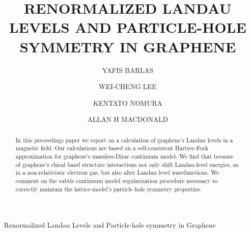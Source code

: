 \documentclass{ws-ijmpb}
\begin{document}
{Renormalized Landau Levels and Particle-hole symmetry in Graphene}

%
\catchline{}{}{}{}{}
%

\title{RENORMALIZED LANDAU LEVELS AND PARTICLE-HOLE SYMMETRY IN GRAPHENE}

\author{YAFIS BARLAS}

\address{Physics Department, University of Texas at Austin, 1 University Station\\
Austin, Texas, 78712, USA\\
National High Magnetic Field Laboratory, Florida State University, 1800 E Paul Dirac 
Dr\\
Tallahassee, Florida, 32310, USA 
barlas@magnet.fsu.edu}

\author{WEI-CHENG LEE}

\address{Physics Department, University of California at San Diego, 9500 Gilman Drive\\
La Jolla, California,  92093, USA
leewc@physics.ucsd.edu}

\author{KENTATO NOMURA}
\address{Department of Physics, Tohoku University \\
Sendai, 980-8578, Japan
nomura@cmpt.phys.tohoku.ac.jp}

\author{ALLAN H MACDONALD}
\address{Physics Department, University of Texas at Austin, 1 University Station\\
Austin, Texas, 78712, USA\\
macd@physics.utexas.edu}



\maketitle

\begin{history}
\end{history}

\begin{abstract}
In this preceedings paper we report on a calculation of graphene's Landau levels in a 
magnetic field. Our calculations are based on a self-consistent Hartree-Fock 
approximation for graphene's massless-Dirac continuum model.  We find that 
because of graphene's chiral band structure interactions not only shift 
Landau-level energies, as in a non-relativistic electron gas, 
but also alter Landau level wavefunctions.  We comment on the subtle continuum 
model regularization procedure necessary to correctly 
maintain the lattice-model's particle hole symmetry properties. 
\end{abstract}
\end{document}
